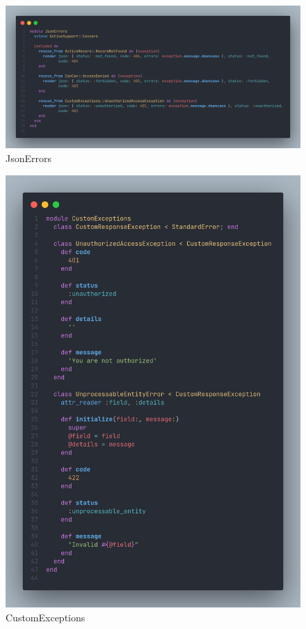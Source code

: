 \begin{justify}
    \begin{figure}[H]
        \centerline{\includegraphics[width=150mm,scale=1]{figures/implementation_and_testing/implementation/backend/json_errors.png}}
        \caption{JsonErrors}
    \end{figure}

    \begin{figure}[H]
        \centerline{\includegraphics[width=150mm,scale=1]{figures/implementation_and_testing/implementation/backend/custom_exceptions.png}}
        \caption{CustomExceptions}
    \end{figure}


\end{justify}
